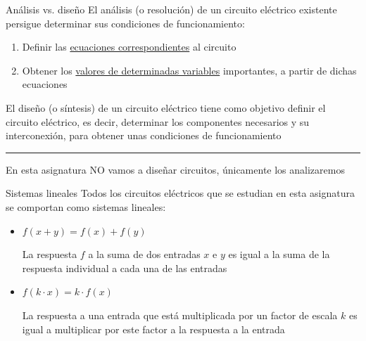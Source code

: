 \documentclass[aspectratio=169, xcolor={usenames,svgnames,dvipsnames}]{beamer}
\begin{document}

\begin{frame}{Análisis vs. diseño}
    El \alert{análisis} (o resolución) de un circuito eléctrico existente persigue determinar sus condiciones de funcionamiento:
    \begin{enumerate}
    \item Definir las \underline{ecuaciones correspondientes} al circuito
    \item Obtener los \underline{valores de determinadas variables} importantes, a partir de dichas ecuaciones
    \end{enumerate}
    
    \vspace{6mm}
    
    El \alert{diseño} (o síntesis) de un circuito eléctrico tiene como objetivo definir el circuito eléctrico, es decir, determinar los componentes necesarios y su interconexión, para obtener unas condiciones de funcionamiento

    \vspace{1mm}
    
    \noindent\rule{\textwidth}{0.5pt}

    \vspace{1mm}
    
    En esta asignatura \alert{NO} vamos a diseñar circuitos, únicamente \alert{los analizaremos}
\end{frame}


\begin{frame}{Sistemas lineales}
    Todos los circuitos eléctricos que se estudian en esta asignatura se comportan como \alert{sistemas lineales}: 
    
    \vspace{5mm}
    \begin{itemize}
    \item \(f(x + y) = f(x) + f(y)\)
    
    La respuesta \(f\) a la suma de dos entradas \(x\) e \(y\) es igual a la suma de la respuesta individual a cada una de las entradas
    
    \vspace{5mm}
    \item \(f(k \cdot x) = k \cdot f(x)\)
    
    La respuesta a una entrada que está multiplicada por un factor de escala \(k\) es igual a multiplicar por este factor a la respuesta a la entrada
    \end{itemize}
\end{frame}
\end{document}
